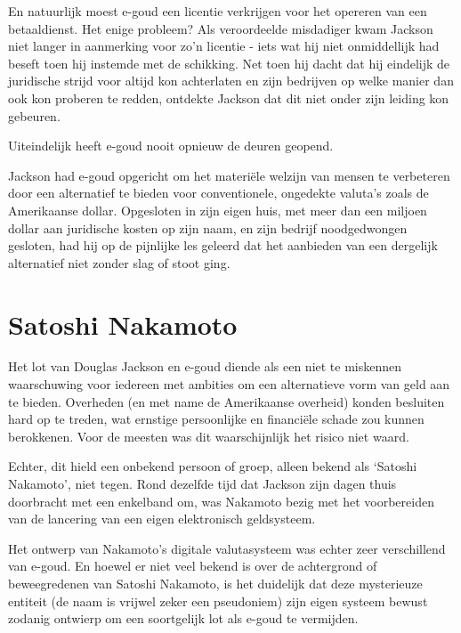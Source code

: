 \documentclass[
  a5paper,
  smalldemyvopaper,11pt,twoside,onecolumn,openright,extrafontsizes]{memoir}
\begin{document}
En natuurlijk moest e-goud een licentie verkrijgen voor het opereren van
een betaaldienst. Het enige probleem? Als veroordeelde misdadiger kwam
Jackson niet langer in aanmerking voor zo'n licentie - iets wat hij niet
onmiddellijk had beseft toen hij instemde met de schikking. Net toen hij
dacht dat hij eindelijk de juridische strijd voor altijd kon achterlaten
en zijn bedrijven op welke manier dan ook kon proberen te redden,
ontdekte Jackson dat dit niet onder zijn leiding kon gebeuren.

Uiteindelijk heeft e-goud nooit opnieuw de deuren geopend.

Jackson had e-goud opgericht om het materiële welzijn van mensen te
verbeteren door een alternatief te bieden voor conventionele, ongedekte
valuta's zoals de Amerikaanse dollar. Opgesloten in zijn eigen huis, met
meer dan een miljoen dollar aan juridische kosten op zijn naam, en zijn
bedrijf noodgedwongen gesloten, had hij op de pijnlijke les geleerd dat
het aanbieden van een dergelijk alternatief niet zonder slag of stoot
ging.

\section*{Satoshi Nakamoto}\label{satoshi-nakamoto}


Het lot van Douglas Jackson en e-goud diende als een niet te miskennen
waarschuwing voor iedereen met ambities om een alternatieve vorm van
geld aan te bieden. Overheden (en met name de Amerikaanse overheid)
konden besluiten hard op te treden, wat ernstige persoonlijke en
financiële schade zou kunnen berokkenen. Voor de meesten was dit
waarschijnlijk het risico niet waard.

Echter, dit hield een onbekend persoon of groep, alleen bekend als
`Satoshi Nakamoto', niet tegen. Rond dezelfde tijd dat Jackson zijn
dagen thuis doorbracht met een enkelband om, was Nakamoto bezig met het
voorbereiden van de lancering van een eigen elektronisch geldsysteem.

Het ontwerp van Nakamoto's digitale valutasysteem was echter zeer
verschillend van e-goud. En hoewel er niet veel bekend is over de
achtergrond of beweegredenen van Satoshi Nakamoto, is het duidelijk dat
deze mysterieuze entiteit (de naam is vrijwel zeker een pseudoniem) zijn
eigen systeem bewust zodanig ontwierp om een soortgelijk lot als e-goud
te vermijden.
\end{document}
